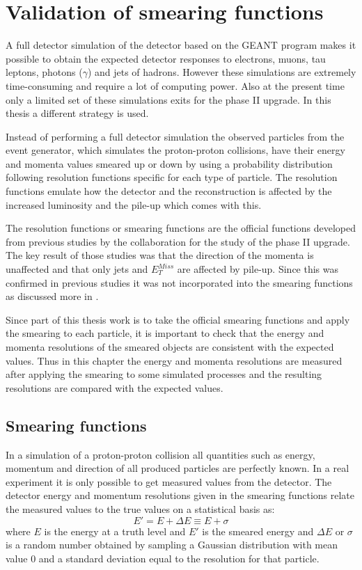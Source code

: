 \chapter{Validation of smearing functions}\label{cha:vali}
A full detector simulation of the \abbrATLAS detector based on the GEANT \citep{Geant4} program makes it possible to obtain the expected detector responses to electrons, muons, tau leptons, photons ($\gamma$) and jets of hadrons. However these simulations are extremely time-consuming and require a lot of computing power. Also at the present time only a limited set of these simulations exits for the \abbrATLAS phase II upgrade. In this thesis a different strategy is used. 

Instead of performing a full detector simulation the observed particles from the event generator, which simulates the proton-proton collisions, have their energy and momenta values smeared up or down by using a probability distribution following resolution functions specific for each type of particle. The resolution functions emulate how the detector and the reconstruction is affected by the increased luminosity and the pile-up which comes with this. 

The resolution functions or smearing functions are the official functions developed from previous studies \citep{ATLAS:LOI2, ATL-PHYS-PUB-2013-004} by the \abbrATLAS collaboration for the study of the \abbrATLAS phase II upgrade. The key result of those studies was that the direction of the momenta is unaffected and that only jets and $E^{Miss}_T$ are affected by pile-up. Since this was confirmed in previous studies it was not incorporated into the smearing functions as discussed more in .

Since part of this thesis work is to take the official \abbrATLAS smearing functions and apply the smearing to each particle, it is important to check that the energy and momenta resolutions of the smeared objects are consistent with the expected values. Thus in this chapter the energy and momenta resolutions are measured after applying the smearing to some simulated processes and the resulting resolutions are compared with the expected values.

\newpage
\section{Smearing functions}\label{sec:smear}
In a simulation of a proton-proton collision all quantities such as energy, momentum and direction of all produced particles are perfectly known. In a real experiment it is only possible to get measured values from the detector. The detector energy and momentum resolutions given in the smearing functions relate the measured values to the true values on a statistical basis as:
\begin{equation}\label{eq:smear}
E' = E + \Delta E \equiv E + \sigma
\end{equation}
where $E$ is the energy at a truth level and $E'$ is the smeared energy and $\Delta E$ or $\sigma$ is a random number obtained by sampling a Gaussian distribution with mean value 0 and a standard deviation equal to the resolution for that particle.

